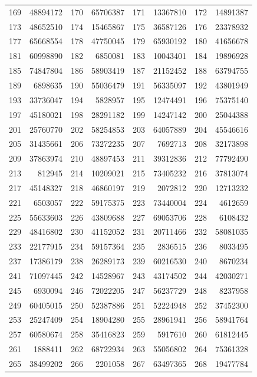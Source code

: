 \begin{longtable}{|r|r|r|r|r|r|r|r|}
169 & 48894172 & 170 & 65706387 & 171 & 13367810 & 172 & 14891387 \\
173 & 48652510 & 174 & 15465867 & 175 & 36587126 & 176 & 23378932 \\
177 & 65668554 & 178 & 47750045 & 179 & 65930192 & 180 & 41656678 \\
181 & 60998890 & 182 & 6850081 & 183 & 10043401 & 184 & 19896928 \\
185 & 74847804 & 186 & 58903419 & 187 & 21152452 & 188 & 63794755 \\
189 & 6898635 & 190 & 55036479 & 191 & 56335097 & 192 & 43801949 \\
193 & 33736047 & 194 & 5828957 & 195 & 12474491 & 196 & 75375140 \\
197 & 45180021 & 198 & 28291182 & 199 & 14247142 & 200 & 25044388 \\
201 & 25760770 & 202 & 58254853 & 203 & 64057889 & 204 & 45546616 \\
205 & 31435661 & 206 & 73272235 & 207 & 7692713 & 208 & 32173898 \\
209 & 37863974 & 210 & 48897453 & 211 & 39312836 & 212 & 77792490 \\
213 & 812945 & 214 & 10209021 & 215 & 73405232 & 216 & 37813074 \\
217 & 45148327 & 218 & 46860197 & 219 & 2072812 & 220 & 12713232 \\
221 & 6503057 & 222 & 59175375 & 223 & 73440004 & 224 & 4612659 \\
225 & 55633603 & 226 & 43809688 & 227 & 69053706 & 228 & 6108432 \\
229 & 48416802 & 230 & 41152052 & 231 & 20711466 & 232 & 58081035 \\
233 & 22177915 & 234 & 59157364 & 235 & 2836515 & 236 & 8033495 \\
237 & 17386179 & 238 & 26289173 & 239 & 60216530 & 240 & 8670234 \\
241 & 71097445 & 242 & 14528967 & 243 & 43174502 & 244 & 42030271 \\
245 & 6930094 & 246 & 72022205 & 247 & 56237729 & 248 & 8237958 \\
249 & 60405015 & 250 & 52387886 & 251 & 52224948 & 252 & 37452300 \\
253 & 25247409 & 254 & 18904280 & 255 & 28961941 & 256 & 58941764 \\
257 & 60580674 & 258 & 35416823 & 259 & 5917610 & 260 & 61812445 \\
261 & 1888411 & 262 & 68722934 & 263 & 55056802 & 264 & 75361328 \\
265 & 38499202 & 266 & 2201058 & 267 & 63497365 & 268 & 19477784 \\

\end{longtable}
